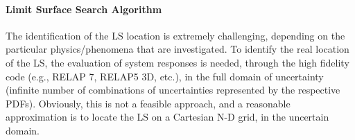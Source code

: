\paragraph{Limit Surface Search Algorithm}
\label{par:LSSalgorithm}
The identification of the LS location is extremely challenging, 
depending on the particular physics/phenomena that are investigated. 
To identify the real location of the LS, the evaluation of system 
responses is needed, through the high fidelity code (e.g., RELAP 7, 
RELAP5 3D, etc.), in the full domain of uncertainty (infinite number of 
combinations of uncertainties represented by the respective PDFs). 
Obviously, this is not a feasible approach, and a reasonable 
approximation is to locate the LS on a Cartesian N-D grid, in the 
uncertain domain.

